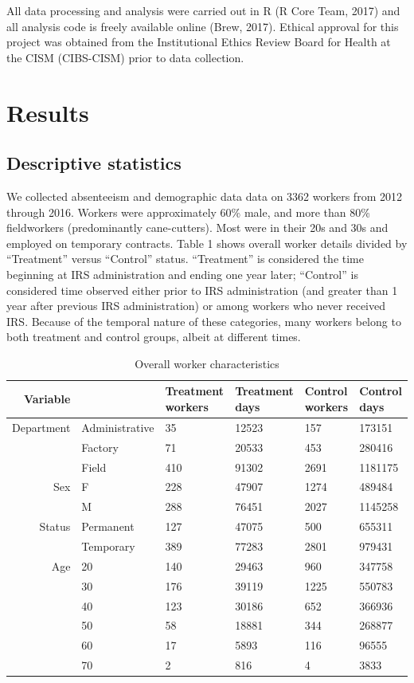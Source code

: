 \documentclass[]{article}
\begin{document}
All data processing and analysis were carried out in R (R Core Team,
2017) and all analysis code is freely available online (Brew, 2017).
Ethical approval for this project was obtained from the Institutional
Ethics Review Board for Health at the CISM (CIBS-CISM) prior to data
collection.

\newpage

\section{Results}\label{results}

\subsection{Descriptive statistics}\label{descriptive-statistics}

We collected absenteeism and demographic data data on 3362 workers from
2012 through 2016. Workers were approximately 60\% male, and more than
80\% fieldworkers (predominantly cane-cutters). Most were in their 20s
and 30s and employed on temporary contracts. Table 1 shows overall
worker details divided by ``Treatment'' versus ``Control'' status.
``Treatment'' is considered the time beginning at IRS administration and
ending one year later; ``Control'' is considered time observed either
prior to IRS administration (and greater than 1 year after previous IRS
administration) or among workers who never received IRS. Because of the
temporal nature of these categories, many workers belong to both
treatment and control groups, albeit at different times.

\begin{table}[ht]
\centering
\begin{tabular}{rlllll}
  \hline
Variable &   & Treatment workers & Treatment days & Control workers & Control days \\ 
  \hline
Department & Administrative &  35 & 12523 & 157 & 173151 \\ 
   & Factory &  71 & 20533 & 453 & 280416 \\ 
   & Field & 410 & 91302 & 2691 & 1181175 \\ 
  Sex & F & 228 & 47907 & 1274 & 489484 \\ 
   & M & 288 & 76451 & 2027 & 1145258 \\ 
  Status & Permanent & 127 & 47075 & 500 & 655311 \\ 
   & Temporary & 389 & 77283 & 2801 & 979431 \\ 
  Age & 20 & 140 & 29463 & 960 & 347758 \\ 
   & 30 & 176 & 39119 & 1225 & 550783 \\ 
   & 40 & 123 & 30186 & 652 & 366936 \\ 
   & 50 &  58 & 18881 & 344 & 268877 \\ 
   & 60 &  17 & 5893 & 116 & 96555 \\ 
   & 70 &   2 & 816 &   4 & 3833 \\ 
   \hline
\end{tabular}
\caption{Overall worker characteristics} 
\end{table}
\end{document}
